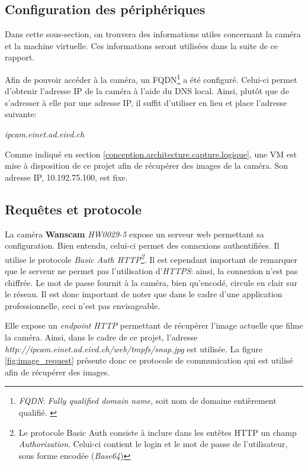 \subsection{Configuration des périphériques}
Dans cette sous-section, on trouvera des informations utiles concernant la caméra et la machine virtuelle. Ces informations seront utilisées dans la suite de ce rapport. 

Afin de pouvoir accéder à la caméra, un FQDN\footnote{\textit{FQDN}: \textit{Fully qualified domain name}, soit nom de domaine entièrement qualifié. \autocite{wiki:FQDN}} a été configuré. Celui-ci permet d'obtenir l'adresse IP de la caméra à l'aide du DNS local. Ainsi, plutôt que de s'adresser à elle par une adresse IP, il suffit d'utiliser en lieu et place l'adresse suivante:
\begin{center}
    \textit{ipcam.einet.ad.eivd.ch}
\end{center}


Comme indiqué en section \ref{conception.architecture.capture.logique}, une VM est mise à disposition de ce projet afin de récupérer des images de la caméra. Son adresse IP, 10.192.75.100, est fixe.

\subsection{Requêtes et protocole}
La caméra \textbf{Wanscam} \textit{HW0029-5} expose un serveur web permettant sa configuration. Bien entendu, celui-ci permet des connexions authentifiées. Il utilise le protocole \textit{Basic Auth HTTP\footnote{Le protocole Basic Auth consiste à inclure dans les entêtes HTTP un champ \textit{Authorization}. Celui-ci contient le login et le mot de passe de l'utilisateur, sous forme encodée (\textit{Base64})}}\autocite{wiki:basic-auth}. Il est cependant important de remarquer que le serveur ne permet pas l'utilisation d'\textit{HTTPS}: ainsi, la connexion n'est pas chiffrée. Le mot de passe fournit à la caméra, bien qu'encodé, circule en clair sur le réseau. Il est  donc important de noter que dans le cadre d'une application professionnelle, ceci n'est pas envisageable.

Elle expose un \textit{endpoint} \textit{HTTP} permettant de récupérer l'image actuelle que filme la caméra. Ainsi, dans le cadre de ce projet, l'adresse \textit{http://ipcam.einet.ad.eivd.ch/web/tmpfs/snap.jpg} est utilisée. La figure \ref{fig:image_request} présente donc ce protocole de communication qui est utilisé afin de récupérer des images.

